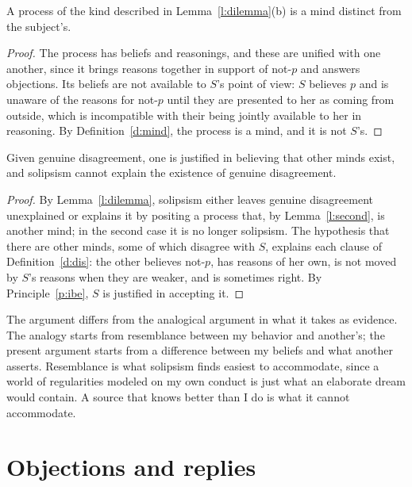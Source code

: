 \documentclass{situationist-preprint}
\begin{document}
\begin{lemma}\label{l:second}
A process of the kind described in Lemma~\ref{l:dilemma}(b) is a mind distinct from the subject's.
\end{lemma}

\begin{proof}
The process has beliefs and reasonings, and these are unified with one another, since it brings reasons together in support of not-$p$ and answers objections. Its beliefs are not available to $S$'s point of view: $S$ believes $p$ and is unaware of the reasons for not-$p$ until they are presented to her as coming from outside, which is incompatible with their being jointly available to her in reasoning. By Definition~\ref{d:mind}, the process is a mind, and it is not $S$'s.
\end{proof}

\begin{theorem}\label{t:main}
Given genuine disagreement, one is justified in believing that other minds exist, and solipsism cannot explain the existence of genuine disagreement.
\end{theorem}

\begin{proof}
By Lemma~\ref{l:dilemma}, solipsism either leaves genuine disagreement unexplained or explains it by positing a process that, by Lemma~\ref{l:second}, is another mind; in the second case it is no longer solipsism. The hypothesis that there are other minds, some of which disagree with $S$, explains each clause of Definition~\ref{d:dis}: the other believes not-$p$, has reasons of her own, is not moved by $S$'s reasons when they are weaker, and is sometimes right. By Principle~\ref{p:ibe}, $S$ is justified in accepting it.
\end{proof}

The argument differs from the analogical argument in what it takes as evidence. The analogy starts from resemblance between my behavior and another's; the present argument starts from a difference between my beliefs and what another asserts. Resemblance is what solipsism finds easiest to accommodate, since a world of regularities modeled on my own conduct is just what an elaborate dream would contain. A source that knows better than I do is what it cannot accommodate.

\section{Objections and replies}
\end{document}
